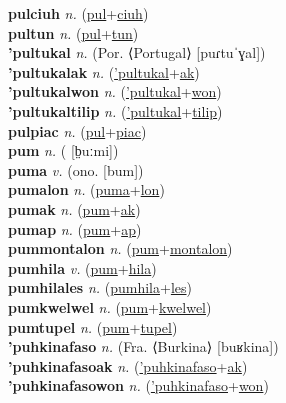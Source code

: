 \textbf{pulciuh} \textit{n.} (\hyperref[pul]{pul}+\hyperref[ciuh]{ciuh})
 \label{pulciuh} \\
\textbf{pultun} \textit{n.} (\hyperref[pul]{pul}+\hyperref[tun]{tun})
 \label{pultun} \\
\textbf{'pultukal} \textit{n.} (Por. ⟨Portugal⟩ [puɾtuˈɣal])
 \label{'pultukal} \\
\textbf{'pultukalak} \textit{n.} (\hyperref['pultukal]{'pultukal}+\hyperref[ak]{ak})
 \label{'pultukalak} \\
\textbf{'pultukalwon} \textit{n.} (\hyperref['pultukal]{'pultukal}+\hyperref[won]{won})
 \label{'pultukalwon} \\
\textbf{'pultukaltilip} \textit{n.} (\hyperref['pultukal]{'pultukal}+\hyperref[tilip]{tilip})
 \label{'pultukaltilip} \\
\textbf{pulpiac} \textit{n.} (\hyperref[pul]{pul}+\hyperref[piac]{piac})
 \label{pulpiac} \\
\textbf{pum} \textit{n.} ( [b̤uːmi])
 \label{pum} \\
\textbf{puma} \textit{v.} (ono. [bum])
 \label{puma} \\
\textbf{pumalon} \textit{n.} (\hyperref[puma]{puma}+\hyperref[lon]{lon})
 \label{pumalon} \\
\textbf{pumak} \textit{n.} (\hyperref[pum]{pum}+\hyperref[ak]{ak})
 \label{pumak} \\
\textbf{pumap} \textit{n.} (\hyperref[pum]{pum}+\hyperref[ap]{ap})
 \label{pumap} \\
\textbf{pummontalon} \textit{n.} (\hyperref[pum]{pum}+\hyperref[montalon]{montalon})
 \label{pummontalon} \\
\textbf{pumhila} \textit{v.} (\hyperref[pum]{pum}+\hyperref[hila]{hila})
 \label{pumhila} \\
\textbf{pumhilales} \textit{n.} (\hyperref[pumhila]{pumhila}+\hyperref[les]{les})
 \label{pumhilales} \\
\textbf{pumkwelwel} \textit{n.} (\hyperref[pum]{pum}+\hyperref[kwelwel]{kwelwel})
 \label{pumkwelwel} \\
\textbf{pumtupel} \textit{n.} (\hyperref[pum]{pum}+\hyperref[tupel]{tupel})
 \label{pumtupel} \\
\textbf{'puhkinafaso} \textit{n.} (Fra. ⟨Burkina⟩ [buʁkina])
 \label{'puhkinafaso} \\
\textbf{'puhkinafasoak} \textit{n.} (\hyperref['puhkinafaso]{'puhkinafaso}+\hyperref[ak]{ak})
 \label{'puhkinafasoak} \\
\textbf{'puhkinafasowon} \textit{n.} (\hyperref['puhkinafaso]{'puhkinafaso}+\hyperref[won]{won})
